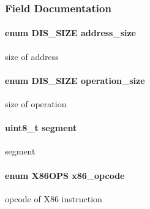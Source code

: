 \subsubsection{Field Documentation}
\hypertarget{struct_d_i_s__fixed_a772bedb1977f1ae07b9f55991f318bd8}{
\paragraph[{address\_\-size}]{\setlength{\rightskip}{0pt plus 5cm}enum {\bf DIS\_\-SIZE} {\bf address\_\-size}}\hfill}
\label{struct_d_i_s__fixed_a772bedb1977f1ae07b9f55991f318bd8}
size of address \hypertarget{struct_d_i_s__fixed_a1a17e54c88513da8e5b1175a785c51ae}{
\paragraph[{operation\_\-size}]{\setlength{\rightskip}{0pt plus 5cm}enum {\bf DIS\_\-SIZE} {\bf operation\_\-size}}\hfill}
\label{struct_d_i_s__fixed_a1a17e54c88513da8e5b1175a785c51ae}
size of operation \hypertarget{struct_d_i_s__fixed_afbf231e07d12db4d0ebf0bc223679ae5}{
\paragraph[{segment}]{\setlength{\rightskip}{0pt plus 5cm}uint8\_\-t {\bf segment}}\hfill}
\label{struct_d_i_s__fixed_afbf231e07d12db4d0ebf0bc223679ae5}
segment \hypertarget{struct_d_i_s__fixed_a372354efff5b025dc9324a03625338a2}{
\paragraph[{x86\_\-opcode}]{\setlength{\rightskip}{0pt plus 5cm}enum {\bf X86OPS} {\bf x86\_\-opcode}}\hfill}
\label{struct_d_i_s__fixed_a372354efff5b025dc9324a03625338a2}
opcode of X86 instruction 
